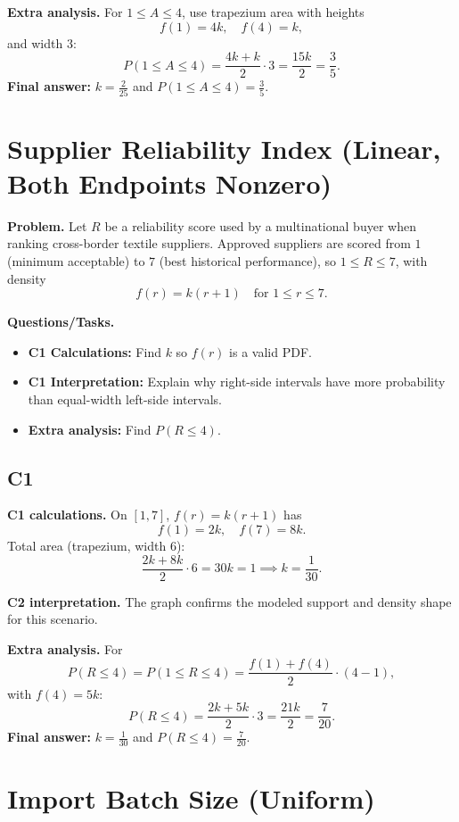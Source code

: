 \textbf{Extra analysis.}
For $1\le A\le4$, use trapezium area with heights
\[
f(1)=4k,\quad f(4)=k,
\]
and width $3$:
\[
P(1\le A\le4)=\frac{4k+k}{2}\cdot3=\frac{15k}{2}=\frac35.
\]
\textbf{Final answer:} $k=\frac{2}{25}$ and $P(1\le A\le4)=\frac35$.
	\section{Supplier Reliability Index (Linear, Both Endpoints Nonzero)}
	
	\textbf{Problem.}
	Let $R$ be a reliability score used by a multinational buyer when ranking cross-border textile suppliers. Approved suppliers are scored from $1$ (minimum acceptable) to $7$ (best historical performance), so $1\le R\le 7$, with density
	\[
	f(r)=k(r+1)\quad\text{for }1\le r\le 7.
	\]
	
	\textbf{Questions/Tasks.}
	\begin{itemize}
		\item \textbf{C1 Calculations:} Find $k$ so $f(r)$ is a valid PDF.
		\item \textbf{C1 Interpretation:} Explain why right-side intervals have more probability than equal-width left-side intervals.
		\item \textbf{Extra analysis:} Find $P(R\le 4)$.
	\end{itemize}

	\subsection*{C1}

\textbf{C1 calculations.}
On $[1,7]$, $f(r)=k(r+1)$ has
	\[
	f(1)=2k,\quad f(7)=8k.
	\]
	Total area (trapezium, width $6$):
	\[
	\frac{2k+8k}{2}\cdot6=30k=1\implies k=\frac1{30}.
	\]

\textbf{C2 interpretation.}
The graph confirms the modeled support and density shape for this scenario.

\textbf{Extra analysis.}
For
\[
P(R\le4)=P(1\le R\le4)=\frac{f(1)+f(4)}{2}\cdot(4-1),
\]
with $f(4)=5k$:
\[
P(R\le4)=\frac{2k+5k}{2}\cdot3=\frac{21k}{2}=\frac7{20}.
\]
\textbf{Final answer:} $k=\frac1{30}$ and $P(R\le4)=\frac7{20}$.
	
	\section{Import Batch Size (Uniform)}
	
